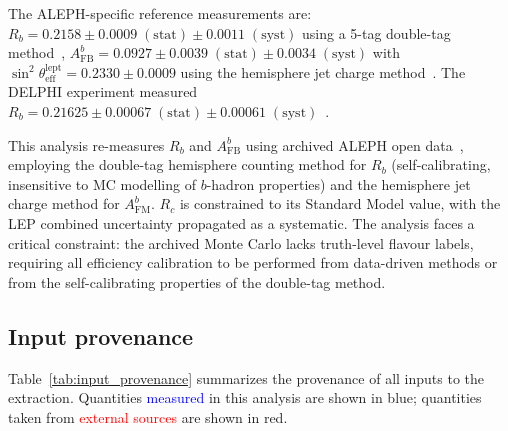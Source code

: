 \documentclass[11pt,a4paper]{article}
\newcommand{\measured}[1]{\textcolor{blue}{#1}}
\newcommand{\external}[1]{\textcolor{red}{#1}}
\begin{document}
The ALEPH-specific reference measurements are:
$R_b = 0.2158 \pm 0.0009\;\mathrm{(stat)} \pm 0.0011\;\mathrm{(syst)}$ using
a 5-tag double-tag method~\cite{ALEPH:Rb:1996},
$A_\mathrm{FB}^b = 0.0927 \pm 0.0039\;\mathrm{(stat)} \pm 0.0034\;\mathrm{(syst)}$
with $\sin^2\theta_\mathrm{eff}^\mathrm{lept} = 0.2330 \pm 0.0009$ using
the hemisphere jet charge method~\cite{ALEPH:AFBb}.
The DELPHI experiment measured $R_b = 0.21625 \pm 0.00067\;\mathrm{(stat)} \pm 0.00061\;\mathrm{(syst)}$~\cite{DELPHI:Rb}.

This analysis re-measures $R_b$ and $A_\mathrm{FB}^b$ using archived ALEPH open
data~\cite{ALEPH:opendata}, employing the double-tag hemisphere counting method
for $R_b$ (self-calibrating, insensitive to MC modelling of $b$-hadron properties)
and the hemisphere jet charge method for $A_\mathrm{FM}^b$.
$R_c$ is constrained to its Standard Model value, with the LEP combined uncertainty
propagated as a systematic.
The analysis faces a critical constraint: the archived Monte Carlo lacks truth-level
flavour labels, requiring all efficiency calibration to be performed from data-driven
methods or from the self-calibrating properties of the double-tag method.

\subsection{Input provenance}
\label{sec:input_provenance}

Table~\ref{tab:input_provenance} summarizes the provenance of all inputs to the
extraction. Quantities \measured{measured} in this analysis are shown in blue;
quantities taken from \external{external sources} are shown in red.
\end{document}
